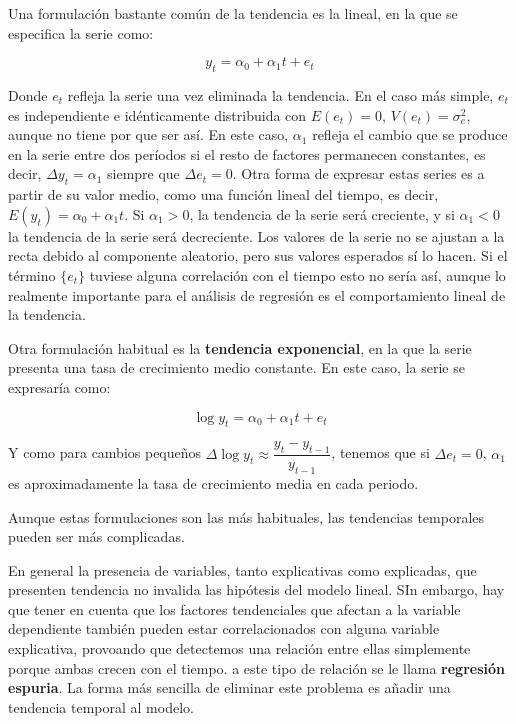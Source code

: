
Una formulaci\'on bastante com\'un de la tendencia es la lineal, en la que se especifica la serie como:

\[y_t=\alpha_0+\alpha_1t+e_t\]

Donde $e_t$ refleja la serie una vez eliminada la tendencia. En el caso m\'as simple, $e_t$ es independiente e id\'enticamente distribuida con $E(e_t)=0$, $V(e_t)=\sigma_e^2$, aunque no tiene por que ser as\'i. En este caso, $\alpha_1$ refleja el cambio que se produce en la serie entre dos per\'iodos si el resto de factores permanecen constantes, es decir, $\Delta y_t=\alpha_1$ siempre que $\Delta e_t=0$. Otra forma de expresar estas series es a partir de su valor medio, como una funci\'on lineal del tiempo, es decir, $E(y_t)=\alpha_0+\alpha_1t$. Si $\alpha_1>0$, la tendencia de la serie ser\'a creciente, y si $\alpha_1<0$ la tendencia de la serie ser\'a decreciente. Los valores de la serie no se ajustan a la recta debido al componente aleatorio, pero sus valores esperados s\'i lo hacen. Si el t\'ermino $\{e_t\}$ tuviese alguna correlaci\'on con el tiempo esto no ser\'ia as\'i, aunque lo realmente importante para el an\'alisis de regresi\'on es el comportamiento lineal de la tendencia.

Otra formulaci\'on habitual es la \textbf{tendencia exponencial}, en la que la serie presenta una tasa de crecimiento medio constante. En este caso, la serie se expresar\'ia como:

\[\log{y_t}=\alpha_0+\alpha_1t+e_t\]

Y como para cambios peque\~nos $\Delta\log{y_t}\approx\dfrac{y_t-y_{t-1}}{y_{t-1}}$, tenemos que si $\Delta e_t=0$, $\alpha_1$ es aproximadamente la tasa de crecimiento media en cada periodo.

Aunque estas formulaciones son las m\'as habituales, las tendencias temporales pueden ser m\'as complicadas.


En general la presencia de variables, tanto explicativas como explicadas, que presenten tendencia no invalida las hip\'otesis del modelo lineal. SIn embargo, hay que tener en cuenta que los factores tendenciales que afectan a la variable dependiente tambi\'en pueden estar correlacionados con alguna variable explicativa, provoando que detectemos una relaci\'on entre ellas simplemente porque ambas crecen con el tiempo. a este tipo de relaci\'on se le llama \textbf{regresi\'on espuria}. La forma m\'as sencilla de eliminar este problema es a\~nadir una tendencia temporal al modelo.

